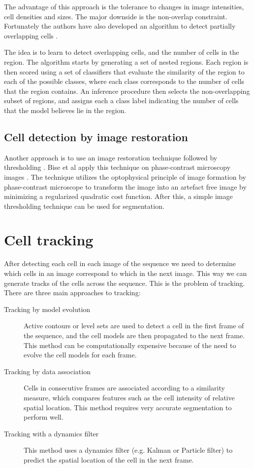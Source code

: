 \documentclass[12pt,a4paper,openany]{book}
\begin{document}
The advantage of this approach is the tolerance to changes in image intensities, cell densities and sizes. The major downside is the non-overlap constraint. Fortunately the authors have also developed an algorithm to detect partially overlapping cells \cite{arteta13}. 

The idea is to learn to detect overlapping cells, and the number of cells in the region. The algorithm starts by generating a set of nested regions. Each region is then scored using a set of classifiers that evaluate the similarity of the region to each of the possible classes, where each class corresponds to the number of cells that the region contains. An inference procedure then selects the non-overlapping subset of regions, and assigns each a class label indicating the number of cells that the model believes lie in the region. 

\subsection{Cell detection by image restoration}

Another approach is to use an image restoration technique followed by thresholding \cite{bise11} \cite{huh13}. Bise et al \cite{bise11} apply this technique on phase-contrast microscopy images . The technique utilizes the optophysical principle of image formation by phase-contrast microscope to transform the image into an artefact free image by minimizing a regularized quadratic cost function. After this, a simple image thresholding technique can be used for segmentation.

\section{Cell tracking}
\label{sec:tracking}

After detecting each cell in each image of the sequence we need to determine which cells in an image correspond to which in the next image. This way we can generate tracks of the cells across the sequence. This is the problem of tracking. There are three main approaches to tracking:

\begin{description}
	\item [Tracking by model evolution] Active contours or level sets are used to detect a cell in the first frame of the sequence, and the cell models are then propagated to the next frame. This method can be computationally expensive because of the need to evolve the cell models for each frame.
	\item [Tracking by data association] Cells in consecutive frames are associated according to a similarity measure, which compares features such as the cell intensity of relative spatial location. This method requires very accurate segmentation to perform well.
	\item [Tracking with a dynamics filter] This method uses a dynamics filter (e.g. Kalman or Particle filter) to predict the spatial location of the cell in the next frame.
\end{description}
\end{document}
